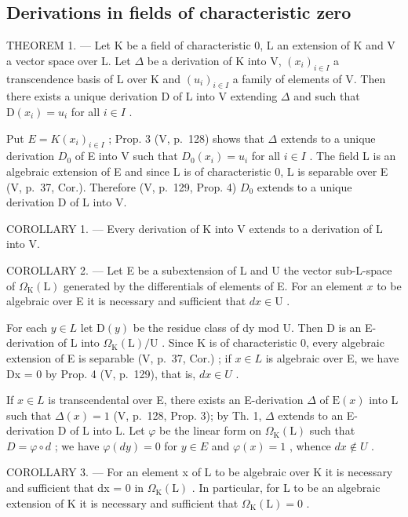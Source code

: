 \subsection{Derivations in fields of characteristic zero}

THEOREM 1. --- Let K be a field of characteristic 0, L an extension of K and V a vector space over L. Let \(\Delta\) be a derivation of K into V, \((x_{i})_{i\in I}\) a transcendence basis of L over K and \((u_{i})_{i\in I}\) a family of elements of V. Then there exists a unique derivation D of L into V extending \(\Delta\) and such that \(\mathrm{D}(x_{i})=u_{i}\) for all \(i\in I\) .

Put \(E = K(x_{i})_{i \in I}\) ; Prop. 3 (V, p.~128) shows that \(\Delta\) extends to a unique derivation \(D_{0}\) of E into V such that \(D_{0}(x_{i}) = u_{i}\) for all \(i \in I\) . The field L is an algebraic extension of E and since L is of characteristic 0, L is separable over E (V, p.~37, Cor.). Therefore (V, p.~129, Prop. 4) \(D_{0}\) extends to a unique derivation D of L into V.

COROLLARY 1. --- Every derivation of K into V extends to a derivation of L into V.

COROLLARY 2. --- Let E be a subextension of L and U the vector sub-L-space of \(\Omega_{\mathrm{K}}(\mathrm{L})\) generated by the differentials of elements of E. For an element \(x\) to be algebraic over E it is necessary and sufficient that \(dx \in \mathrm{U}\) .

For each \(y \in L\) let \(\mathrm{D}(y)\) be the residue class of dy mod U. Then D is an E-derivation of L into \(\Omega_{\mathrm{K}}(\mathrm{L})/\mathrm{U}\) . Since K is of characteristic 0, every algebraic extension of E is separable (V, p.~37, Cor.) ; if \(x \in L\) is algebraic over E, we have Dx = 0 by Prop. 4 (V, p.~129), that is, \(dx \in U\) .

If \(x \in L\) is transcendental over E, there exists an E-derivation \(\Delta\) of \(\mathrm{E}(x)\) into L such that \(\Delta(x) = 1\) (V, p.~128, Prop. 3); by Th. 1, \(\Delta\) extends to an E-derivation D of L into L. Let \(\varphi\) be the linear form on \(\Omega_{\mathrm{K}}(\mathrm{L})\) such that \(D = \varphi \circ d\) ; we have \(\varphi(dy) = 0\) for \(y \in E\) and \(\varphi(x) = 1\) , whence \(dx \notin U\) .

COROLLARY 3. --- For an element x of L to be algebraic over K it is necessary and sufficient that dx = 0 in \(\Omega_{\mathrm{K}}(\mathrm{L})\) . In particular, for L to be an algebraic extension of K it is necessary and sufficient that \(\Omega_{\mathrm{K}}(\mathrm{L}) = 0\) .

